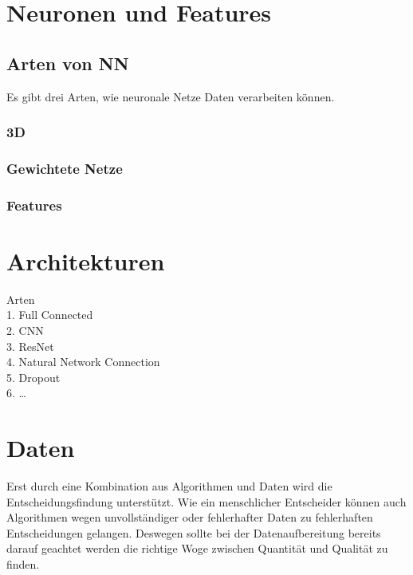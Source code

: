 \documentclass[12pt,oneside,a4paper,parskip]{scrbook}
\begin{document}
\section{Neuronen und Features}
\subsection{Arten von NN}
Es gibt drei Arten, wie neuronale Netze Daten verarbeiten können.
\subsubsection{3D}
\subsubsection{Gewichtete Netze}
\subsubsection{Features}

\section{Architekturen}
Arten
\\1.	Full Connected
\\2.	CNN
\\3.	ResNet
\\4.	Natural Network Connection
\\5.	Dropout
\\6.	…

\section{Daten}
\label{section:Data}
Erst durch eine Kombination aus Algorithmen und Daten wird die Entscheidungsfindung unterstützt. Wie ein menschlicher Entscheider können auch Algorithmen wegen unvollständiger oder fehlerhafter Daten zu fehlerhaften Entscheidungen gelangen.
Deswegen sollte bei der Datenaufbereitung bereits darauf geachtet werden die richtige Woge zwischen Quantität und Qualität zu finden.
\end{document}
